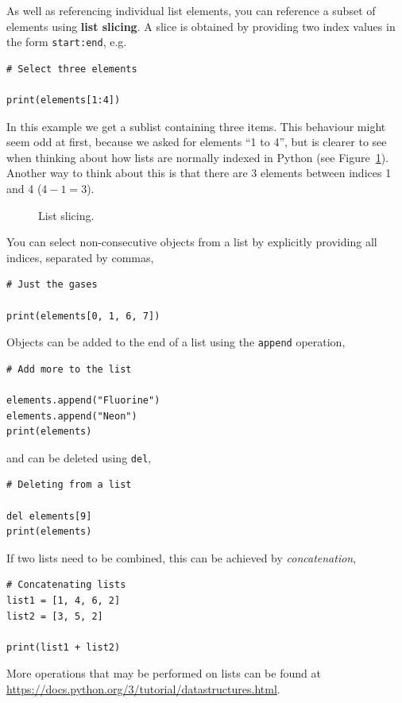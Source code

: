 \documentclass[a4paper]{article}
\begin{document}
As well as referencing individual list elements, you can reference a subset of elements using \textbf{list slicing}. A slice is obtained by providing two index values in the form \texttt{start:end}, e.g.
\begin{lstlisting}
# Select three elements

print(elements[1:4])
\end{lstlisting}
In this example we get a sublist containing three items. This behaviour might seem odd at first, because we asked for elements ``1 to 4'', but is clearer to see when thinking about how lists are normally indexed in Python (see Figure~\ref{fig:list_slicing}). Another way to think about this is that there are 3 elements between indices 1 and 4 ($4-1=3$).
\begin{figure}[tb]
  \centering
    \caption{\label{fig:list_slicing}List slicing.}
\end{figure}
You can select non-consecutive objects from a list by explicitly providing all indices, separated by commas,
\begin{lstlisting}
# Just the gases

print(elements[0, 1, 6, 7])
\end{lstlisting}
Objects can be added to the end of a list using the \texttt{append} operation,
\begin{lstlisting}
# Add more to the list

elements.append("Fluorine")
elements.append("Neon")
print(elements)
\end{lstlisting}
and can be deleted using \texttt{del},
\begin{lstlisting}
# Deleting from a list

del elements[9]
print(elements)
\end{lstlisting}
If two lists need to be combined, this can be achieved by \emph{concatenation},
\begin{lstlisting}
# Concatenating lists
list1 = [1, 4, 6, 2]
list2 = [3, 5, 2]

print(list1 + list2)
\end{lstlisting}
More operations that may be performed on lists can be found at \url{https://docs.python.org/3/tutorial/datastructures.html}.
\end{document}
